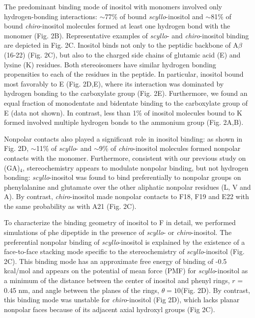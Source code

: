 
The predominant binding mode of inositol with monomers involved only hydrogen-bonding interactions: $\sim$77\% of bound \emph{scyllo}-inositol and $\sim$81\% of bound \emph{chiro}-inositol molecules formed at least one hydrogen bond with the monomer (Fig. 2B). Representative examples of \emph{scyllo}- and \emph{chiro}-inositol binding are depicted in Fig. 2C.  Inositol binds not only to the peptidic backbone of A$\beta$(16-22) (Fig. 2C), but also to the charged side chains of glutamic acid (E) and lysine (K) residues. Both stereoisomers have similar hydrogen bonding propensities to each of the residues in the peptide. In particular, inositol bound most favorably to E (Fig. 2D,E), where its interaction was dominated by hydrogen bonding to the carboxylate group (Fig. 2E). Furthermore, we found an equal fraction of monodentate and bidentate binding to the carboxylate group of E (data not shown). In contrast, less than 1\% of inositol molecules bound to K formed involved multiple hydrogen bonds to the ammonium group (Fig. 2A,B).

Nonpolar contacts also played a significant role in inositol binding: as shown in Fig. 2D, $\sim$11\% of \emph{scyllo}- and $\sim$9\% of \emph{chiro}-inositol molecules formed nonpolar contacts with the monomer. Furthermore, consistent with our previous study on (GA)$_4$, stereochemistry appears to modulate nonpolar binding, but not hydrogen bonding: \emph{scyllo}-inositol was found to bind preferentially to nonpolar groups on phenylalanine and glutamate over the other aliphatic nonpolar residues (L, V and A). By contrast, \emph{chiro}-inositol made nonpolar contacts to F18, F19 and E22 with the same probability as with A21 (Fig. 2C).
	
To characterize the binding geometry of inositol to F in detail, we performed simulations of phe dipeptide in the presence of \emph{scyllo}- or \emph{chiro}-inositol. The preferential nonpolar binding of \emph{scyllo}-inositol is explained by the existence of a face-to-face stacking mode specific to the stereochemistry of \emph{scyllo}-inositol (Fig. 2C). This binding mode has an approximate free energy of binding of -0.5 kcal/mol and appears on the potential of mean force (PMF) for \emph{scyllo}-inositol as a minimum of the distance between the center of inositol and phenyl rings, $r$ = 0.45 nm, and angle between the planes of the rings, $\theta = 10$\mathdeg (Fig. 2D). By contrast, this binding mode was unstable for \emph{chiro}-inositol (Fig 2D), which lacks planar nonpolar faces because of its adjacent axial hydroxyl groups (Fig 2C).


